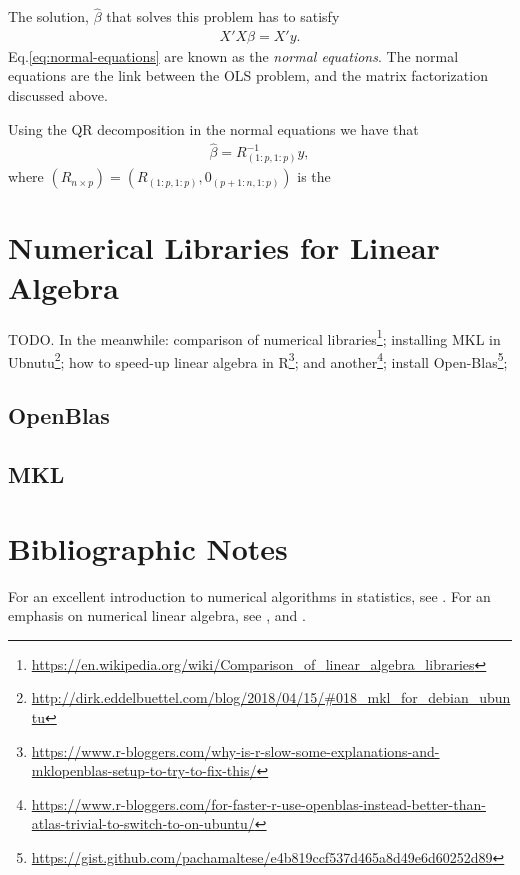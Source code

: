 \documentclass[]{book}
\renewcommand{\href}[2]{#2\footnote{\url{#1}}}
\theoremstyle{definition}
\theoremstyle{definition}
\theoremstyle{definition}
\theoremstyle{remark}
\begin{document}
The solution, \(\hat \beta\) that solves this problem has to satisfy
\begin{align}
  X'X \beta = X'y.
  \label{eq:normal-equations}
\end{align}
Eq.\eqref{eq:normal-equations} are known as the \emph{normal equations}.
The normal equations are the link between the OLS problem, and the matrix factorization discussed above.

Using the QR decomposition in the normal equations we have that
\begin{align*}
  \hat \beta = R_{(1:p,1:p)}^{-1} y,
\end{align*}
where \((R_{n\times p})=(R_{(1:p,1:p)},0_{(p+1:n,1:p)})\) is the

\hypertarget{numerical-libraries-for-linear-algebra}{%
\section{Numerical Libraries for Linear Algebra}\label{numerical-libraries-for-linear-algebra}}

TODO.
In the meanwhile:
\href{https://en.wikipedia.org/wiki/Comparison_of_linear_algebra_libraries}{comparison of numerical libraries};
\href{http://dirk.eddelbuettel.com/blog/2018/04/15/\#018_mkl_for_debian_ubuntu}{installing MKL in Ubnutu};
\href{https://www.r-bloggers.com/why-is-r-slow-some-explanations-and-mklopenblas-setup-to-try-to-fix-this/}{how to speed-up linear algebra in R};
\href{https://www.r-bloggers.com/for-faster-r-use-openblas-instead-better-than-atlas-trivial-to-switch-to-on-ubuntu/}{and another};
\href{https://gist.github.com/pachamaltese/e4b819ccf537d465a8d49e6d60252d89}{install Open-Blas};

\hypertarget{openblas}{%
\subsection{OpenBlas}\label{openblas}}

\hypertarget{mkl}{%
\subsection{MKL}\label{mkl}}

\hypertarget{bibliographic-notes-15}{%
\section{Bibliographic Notes}\label{bibliographic-notes-15}}

For an excellent introduction to numerical algorithms in statistics, see \citet{weihs2013foundations}.
For an emphasis on numerical linear algebra, see \citet{gentle2012numerical}, and \citet{golub2012matrix}.
\end{document}
